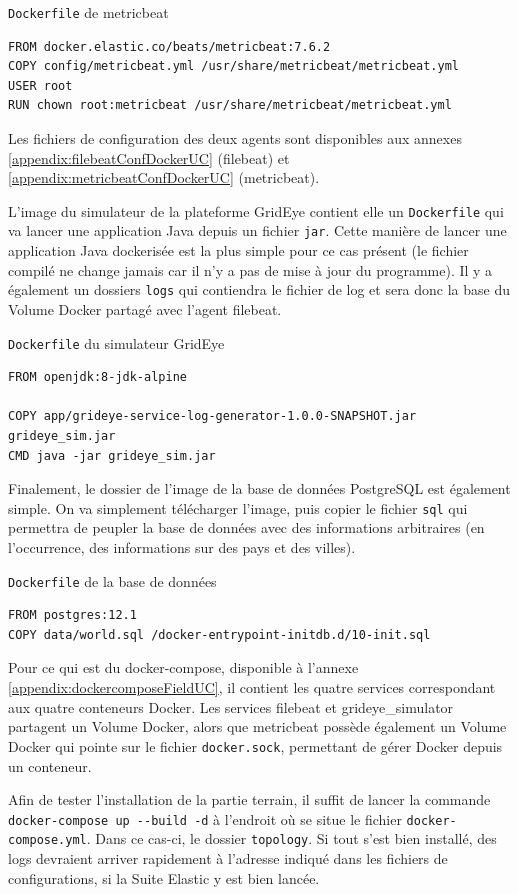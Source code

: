 \documentclass[paper=a4, fontsize=11pt]{scrartcl}
\begin{document}
\verb,Dockerfile, de metricbeat
\begin{lstlisting}
FROM docker.elastic.co/beats/metricbeat:7.6.2
COPY config/metricbeat.yml /usr/share/metricbeat/metricbeat.yml
USER root
RUN chown root:metricbeat /usr/share/metricbeat/metricbeat.yml
\end{lstlisting}

Les fichiers de configuration des deux agents sont disponibles aux annexes \ref{appendix:filebeatConfDockerUC} (filebeat) et \ref{appendix:metricbeatConfDockerUC} (metricbeat).

L'image du simulateur de la plateforme GridEye contient elle un \verb,Dockerfile, qui va lancer une application Java depuis un fichier \verb,jar,. Cette manière de lancer une application Java dockerisée est la plus simple pour ce cas présent (le fichier compilé ne change jamais car il n'y a pas de mise à jour du programme). Il y a également un dossiers \verb,logs, qui contiendra le fichier de log et sera donc la base du Volume Docker partagé avec l'agent filebeat.

\verb,Dockerfile, du simulateur GridEye
\begin{lstlisting}
FROM openjdk:8-jdk-alpine

COPY app/grideye-service-log-generator-1.0.0-SNAPSHOT.jar grideye_sim.jar
CMD java -jar grideye_sim.jar
\end{lstlisting}

Finalement, le dossier de l'image de la base de données PostgreSQL est également simple. On va simplement télécharger l'image, puis copier le fichier \verb,sql, qui permettra de peupler la base de données avec des informations arbitraires (en l'occurrence, des informations sur des pays et des villes).

\verb,Dockerfile, de la base de données
\begin{lstlisting}
FROM postgres:12.1
COPY data/world.sql /docker-entrypoint-initdb.d/10-init.sql
\end{lstlisting}

Pour ce qui est du docker-compose, disponible à l'annexe \ref{appendix:dockercomposeFieldUC}, il contient les quatre services correspondant aux quatre conteneurs Docker. Les services filebeat et grideye\_simulator partagent un Volume Docker, alors que metricbeat possède également un Volume Docker qui pointe sur le fichier \verb,docker.sock,, permettant de gérer Docker depuis un conteneur.

Afin de tester l'installation de la partie terrain, il suffit de lancer la commande \verb,docker-compose up --build -d, à l’endroit où se situe le fichier \verb,docker-compose.yml,. Dans ce cas-ci, le dossier \verb,topology,. Si tout s'est bien installé, des logs devraient arriver rapidement à l'adresse indiqué dans les fichiers de configurations, si la Suite Elastic y est bien lancée.
\end{document}
